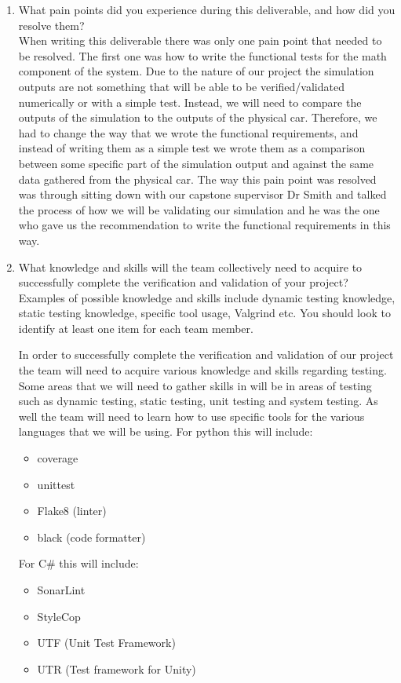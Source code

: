 \documentclass[12pt, titlepage]{article}
\begin{document}
\begin{enumerate}
  \item What pain points did you experience during this deliverable, and how
    did you resolve them?\\
    When writing this deliverable there was only one pain point that needed to be resolved.
    The first one was how to write the functional tests for the math component of the system.
    Due to the nature of our project the simulation outputs are not something that will be able to be verified/validated numerically or with a simple test.
    Instead, we will need to compare the outputs of the simulation to the outputs of the physical car.
    Therefore, we had to change the way that we wrote the functional requirements, and instead of writing them as a simple test we wrote them as a comparison between some specific part of the simulation output and against the same data gathered from the physical car.
    The way this pain point was resolved was through sitting down with our capstone supervisor Dr Smith and talked the process of how we will be validating our simulation and he was the one who gave us the recommendation to write the functional requirements in this way.
  \item What knowledge and skills will the team collectively need to acquire to
  successfully complete the verification and validation of your project?
  Examples of possible knowledge and skills include dynamic testing knowledge,
  static testing knowledge, specific tool usage, Valgrind etc.  You should look to
  identify at least one item for each team member.

  In order to successfully complete the verification and validation of our project the team will need to acquire various knowledge and skills regarding testing.
  Some areas that we will need to gather skills in will be in areas of testing such as dynamic testing, static testing, unit testing and system testing. 
  As well the team will need to learn how to use specific tools for the various languages that we will be using.
  For python this will include:
  \begin{itemize}
    \item coverage
    \item unittest
    \item Flake8 (linter)
    \item black (code formatter)
  \end{itemize}
  For C\# this will include:
  \begin{itemize}
    \item SonarLint
    \item StyleCop
    \item UTF (Unit Test Framework)
    \item UTR (Test framework for Unity)
  \end{itemize}


\end{enumerate}
\end{document}
